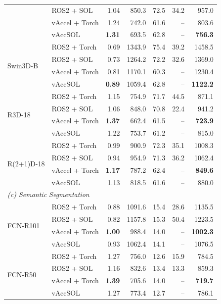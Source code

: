 \begin{table}[t]
\begin{tabular}{llrrrrr}
 & ROS2 + SOL & 1.04 & 850.3 & 72.5 & 34.2 & 957.0 \\
 & vAccel + Torch & 1.24 & 742.0 & 61.6 & -- & 803.6 \\
 & vAccSOL & \textbf{1.31} & 693.5 & 62.8 & -- & \textbf{756.3} \\
\cmidrule(lr){1-7}
\multirow{4}{*}{Swin3D-B} & ROS2 + Torch & 0.69 & 1343.9 & 75.4 & 39.2 & 1458.5 \\
 & ROS2 + SOL & 0.73 & 1264.2 & 72.2 & 32.6 & 1369.0 \\
 & vAccel + Torch & 0.81 & 1170.1 & 60.3 & -- & 1230.4 \\
 & vAccSOL & \textbf{0.89} & 1059.4 & 62.8 & -- & \textbf{1122.2} \\
\cmidrule(lr){1-7}
\multirow{4}{*}{R3D-18} & ROS2 + Torch & 1.15 & 754.9 & 71.7 & 44.5 & 871.1 \\
 & ROS2 + SOL & 1.06 & 848.0 & 70.8 & 22.4 & 941.2 \\
 & vAccel + Torch & \textbf{1.37} & 662.4 & 61.5 & -- & \textbf{723.9} \\
 & vAccSOL & 1.22 & 753.7 & 61.2 & -- & 815.0 \\
\cmidrule(lr){1-7}
\multirow{4}{*}{R(2+1)D-18} & ROS2 + Torch & 0.99 & 900.9 & 72.3 & 35.1 & 1008.3 \\
 & ROS2 + SOL & 0.94 & 954.9 & 71.3 & 36.2 & 1062.4 \\
 & vAccel + Torch & \textbf{1.17} & 787.2 & 62.4 & -- & \textbf{849.6} \\
 & vAccSOL & 1.13 & 818.5 & 61.6 & -- & 880.0 \\
\cmidrule(lr){1-7}
\midrule
\multicolumn{7}{l}{\textit{(c) Semantic Segmentation}} \\
\midrule
\multirow{4}{*}{FCN-R101} & ROS2 + Torch & 0.88 & 1091.6 & 15.4 & 28.6 & 1135.5 \\
 & ROS2 + SOL & 0.82 & 1157.8 & 15.3 & 50.4 & 1223.5 \\
 & vAccel + Torch & \textbf{1.00} & 988.4 & 14.0 & -- & \textbf{1002.3} \\
 & vAccSOL & 0.93 & 1062.4 & 14.1 & -- & 1076.5 \\
\cmidrule(lr){1-7}
\multirow{4}{*}{FCN-R50} & ROS2 + Torch & 1.27 & 756.0 & 12.6 & 15.9 & 784.5 \\
 & ROS2 + SOL & 1.16 & 832.6 & 13.4 & 13.3 & 859.3 \\
 & vAccel + Torch & \textbf{1.39} & 705.6 & 14.0 & -- & \textbf{719.7} \\
 & vAccSOL & 1.27 & 773.4 & 12.7 & -- & 786.1 \\

\end{tabular}
\end{table}
